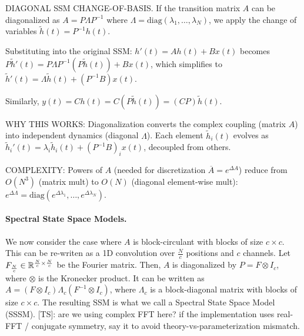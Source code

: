 \documentclass{article}
\newcommand{\TS}[1]{{\color{pink}[TS]: #1}}
\begin{document}
\begin{thomasbox}
DIAGONAL SSM CHANGE-OF-BASIS. If the transition matrix $A$ can be diagonalized as $A = P\Lambda P^{-1}$ where $\Lambda = \mathrm{diag}(\lambda_1, \ldots, \lambda_N)$, we apply the change of variables $\widetilde{h}(t) = P^{-1} h(t)$.

Substituting into the original SSM:
$h'(t) = Ah(t) + Bx(t)$ becomes $P\widetilde{h}'(t) = P\Lambda P^{-1}(P\widetilde{h}(t)) + Bx(t)$, which simplifies to $\widetilde{h}'(t) = \Lambda \widetilde{h}(t) + (P^{-1}B) x(t)$.

Similarly, $y(t) = Ch(t) = C(P\widetilde{h}(t)) = (CP)\widetilde{h}(t)$.

WHY THIS WORKS: Diagonalization converts the complex coupling (matrix $A$) into independent dynamics (diagonal $\Lambda$). Each element $\widetilde{h}_i(t)$ evolves as $\widetilde{h}_i'(t) = \lambda_i \widetilde{h}_i(t) + (P^{-1}B)_{i} x(t)$, decoupled from others.

COMPLEXITY: Powers of $A$ (needed for discretization $\overline{A} = e^{\Delta A}$) reduce from $O(N^3)$ (matrix mult) to $O(N)$ (diagonal element-wise mult): $e^{\Delta \Lambda} = \mathrm{diag}(e^{\Delta \lambda_1}, \ldots, e^{\Delta \lambda_N})$.
\end{thomasbox}

\paragraph{Spectral State Space Models.} We now consider the case where $A$ is block-circulant with blocks of size $c \!\times\! c$. This can be re-writen as a 1D convolution over $\frac{N}{c}$ positions and $c$ channels. Let $F_{\frac{N}{c}} \in \mathbb{R}^{\frac{N}{c} \times \frac{N}{c}}$ be the Fourier matrix. Then, $A$ is diagonalized by $P = F \otimes I_c$, where $\otimes$ is the Kronecker product. It can be written as $A = (F \otimes I_c) \Lambda_c (F^{-1} \otimes I_c)$, where $\Lambda_c$ is a block-diagonal matrix with blocks of size $c \!\times\! c$. The resulting SSM is what we call a Spectral State Space Model (SSSM).
\TS{are we using complex FFT here? if the implementation uses real-FFT / conjugate symmetry, say it to avoid theory-vs-parameterization mismatch.}
\end{document}
